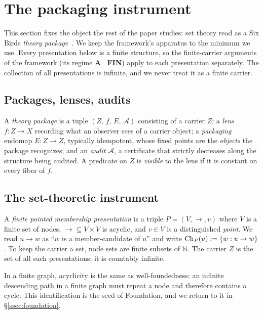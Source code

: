 \section{The packaging instrument}\label{sec:instrument}

This section fixes the object the rest of the paper studies: set theory read as a Six Birds
\emph{theory package}~\citep{SBTFoundationsI}. We keep the framework's apparatus to the minimum
we use. Every presentation below is a finite structure, so the finite-carrier arguments of the
framework (its regime \textbf{A\_FIN}) apply to each presentation separately. The collection of
all presentations is infinite, and we never treat it as a finite carrier.

\subsection{Packages, lenses, audits}

\begin{convention}\label{conv:package}
A \emph{theory package} is a tuple $(Z,\,f,\,E,\,\mathcal A)$ consisting of a carrier $Z$; a
\emph{lens} $f\colon Z\to X$ recording what an observer sees of a carrier object; a
\emph{packaging} endomap $E\colon Z\to Z$, typically idempotent, whose fixed points are the
\emph{objects} the package recognizes; and an \emph{audit} $\mathcal A$, a certificate that
strictly decreases along the structure being audited. A predicate on $Z$ is \emph{visible} to
the lens if it is constant on every fiber of $f$.
\end{convention}

\subsection{The set-theoretic instrument}

\begin{definition}\label{def:presentation}
A \emph{finite pointed membership presentation} is a triple $P=(V,\to,v)$ where $V$ is a finite
set of nodes, ${\to}\subseteq V\times V$ is acyclic, and $v\in V$ is a distinguished
\emph{point}. We read $u\to w$ as ``$w$ is a member-candidate of $u$'' and write
$\operatorname{Ch}_P(u):=\{w: u\to w\}$. To keep the carrier a set, node sets are finite subsets of
$\mathbb N$. The carrier $Z$ is the set of all such presentations; it is countably infinite.
\end{definition}

In a finite graph, acyclicity is the same as well-foundedness: an infinite descending path in a
finite graph must repeat a node and therefore contains a cycle. This identification is the seed
of Foundation, and we return to it in \S\ref{ssec:foundation}.

